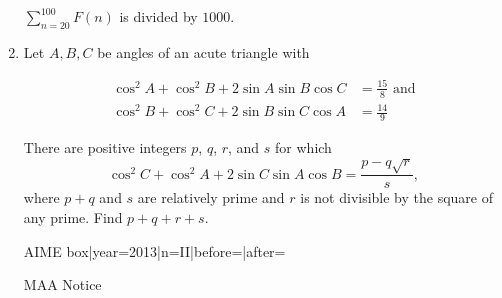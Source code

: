 \documentclass{article}
\begin{document}
\begin{enumerate}[label=\arabic*., itemsep=0.5em]
\(\sum\limits_{n=20}^{100} F(n)\) is divided by \(1000\).\par \vspace{0.5em}\item Let \(A,B,C\) be angles of an acute triangle with

\begin{align*}
\cos^2 A + \cos^2 B + 2 \sin A \sin B \cos C &= \frac{15}{8} \text{ and} \\
\cos^2 B + \cos^2 C + 2 \sin B \sin C \cos A &= \frac{14}{9}
\end{align*}

There are positive integers \(p\), \(q\), \(r\), and \(s\) for which 
\begin{equation*}
\cos^2 C + \cos^2 A + 2 \sin C \sin A \cos B = \frac{p-q\sqrt{r}}{s},
\end{equation*}
 where \(p+q\) and \(s\) are relatively prime and \(r\) is not divisible by the square of any prime.  Find \(p+q+r+s\).



{{AIME box|year=2013|n=II|before=|after=}}

{{MAA Notice}}\par \vspace{0.5em}\end{enumerate}
\end{document}
